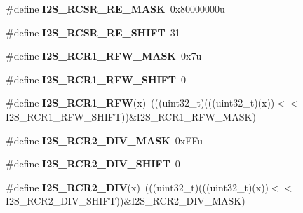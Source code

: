 \begin{DoxyCompactItemize}
\item 
\#define {\bfseries I2\+S\+\_\+\+R\+C\+S\+R\+\_\+\+R\+E\+\_\+\+M\+A\+SK}~0x80000000u\hypertarget{group__I2S__Register__Masks_gad72205d781328e9b391811123b8e115f}{}\label{group__I2S__Register__Masks_gad72205d781328e9b391811123b8e115f}

\item 
\#define {\bfseries I2\+S\+\_\+\+R\+C\+S\+R\+\_\+\+R\+E\+\_\+\+S\+H\+I\+FT}~31\hypertarget{group__I2S__Register__Masks_gaedda1d8255b891c8abfaf0104a73e6bf}{}\label{group__I2S__Register__Masks_gaedda1d8255b891c8abfaf0104a73e6bf}

\item 
\#define {\bfseries I2\+S\+\_\+\+R\+C\+R1\+\_\+\+R\+F\+W\+\_\+\+M\+A\+SK}~0x7u\hypertarget{group__I2S__Register__Masks_gaa01b4e3c93f7d6e394ae98744b23ce2e}{}\label{group__I2S__Register__Masks_gaa01b4e3c93f7d6e394ae98744b23ce2e}

\item 
\#define {\bfseries I2\+S\+\_\+\+R\+C\+R1\+\_\+\+R\+F\+W\+\_\+\+S\+H\+I\+FT}~0\hypertarget{group__I2S__Register__Masks_ga0377763c289535be469c9c34d4e5db0a}{}\label{group__I2S__Register__Masks_ga0377763c289535be469c9c34d4e5db0a}

\item 
\#define {\bfseries I2\+S\+\_\+\+R\+C\+R1\+\_\+\+R\+FW}(x)~(((uint32\+\_\+t)(((uint32\+\_\+t)(x))$<$$<$I2\+S\+\_\+\+R\+C\+R1\+\_\+\+R\+F\+W\+\_\+\+S\+H\+I\+FT))\&I2\+S\+\_\+\+R\+C\+R1\+\_\+\+R\+F\+W\+\_\+\+M\+A\+SK)\hypertarget{group__I2S__Register__Masks_gabd25b9a6ddd7887e010e4fac7ecb842c}{}\label{group__I2S__Register__Masks_gabd25b9a6ddd7887e010e4fac7ecb842c}

\item 
\#define {\bfseries I2\+S\+\_\+\+R\+C\+R2\+\_\+\+D\+I\+V\+\_\+\+M\+A\+SK}~0x\+F\+Fu\hypertarget{group__I2S__Register__Masks_ga2a4f6e6b8d73e0abf6f0d5b0979182e2}{}\label{group__I2S__Register__Masks_ga2a4f6e6b8d73e0abf6f0d5b0979182e2}

\item 
\#define {\bfseries I2\+S\+\_\+\+R\+C\+R2\+\_\+\+D\+I\+V\+\_\+\+S\+H\+I\+FT}~0\hypertarget{group__I2S__Register__Masks_gaa9a14126d11b963220e6b98c027be2e1}{}\label{group__I2S__Register__Masks_gaa9a14126d11b963220e6b98c027be2e1}

\item 
\#define {\bfseries I2\+S\+\_\+\+R\+C\+R2\+\_\+\+D\+IV}(x)~(((uint32\+\_\+t)(((uint32\+\_\+t)(x))$<$$<$I2\+S\+\_\+\+R\+C\+R2\+\_\+\+D\+I\+V\+\_\+\+S\+H\+I\+FT))\&I2\+S\+\_\+\+R\+C\+R2\+\_\+\+D\+I\+V\+\_\+\+M\+A\+SK)\hypertarget{group__I2S__Register__Masks_gacee150fec7431041bd054a753160464e}{}\label{group__I2S__Register__Masks_gacee150fec7431041bd054a753160464e}


\end{DoxyCompactItemize}
